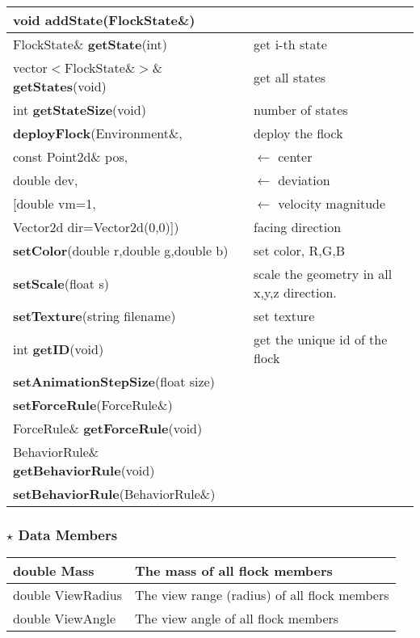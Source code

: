 \documentclass[onecolumn,10pt]{article}
\begin{document}
\begin{tabular}{|l|l|}\hline
void {\bf addState}(FlockState\&)                  & \\\hline
FlockState\& {\bf getState}(int)                   & get i-th state\\\hline
vector$<$FlockState\&$>$\& {\bf getStates}(void)   &  get all states\\\hline
int {\bf getStateSize}(void)                       &  number of states\\\hline
{\bf deployFlock}(Environment\&,                   &  deploy the flock\\
            const Point2d\& pos,                   & $\leftarrow$ center \\
	    double dev,                            & $\leftarrow$ deviation \\
            {[}double vm=1,                        & $\leftarrow$  velocity magnitude \\
	    Vector2d dir=Vector2d(0,0){]})         & facing direction \\\hline\hline
{\bf setColor}(double r,double g,double b)         & set color, R,G,B \\\hline
{\bf setScale}(float s)                            & scale the geometry in all x,y,z direction. \\\hline
{\bf setTexture}(string filename)                  & set texture\\\hline
int {\bf getID}(void)                              & get the unique id of the flock \\\hline
{\bf setAnimationStepSize}(float size)             & \\\hline\hline
{\bf setForceRule}(ForceRule\&)          & \\\hline
ForceRule\& {\bf  getForceRule}(void)         & \\\hline
BehaviorRule\& {\bf getBehaviorRule}(void)  & \\\hline
{\bf setBehaviorRule}(BehaviorRule\&)   & \\\hline
\end{tabular}

\subsubsection*{$\star$ Data Members}

\begin{tabular}{|l|l|}\hline
double Mass        & The mass of all flock members \\\hline
double ViewRadius  & The view range (radius) of all flock members \\\hline
double ViewAngle   & The view angle of all flock members \\\hline
\end{tabular}
\end{document}
